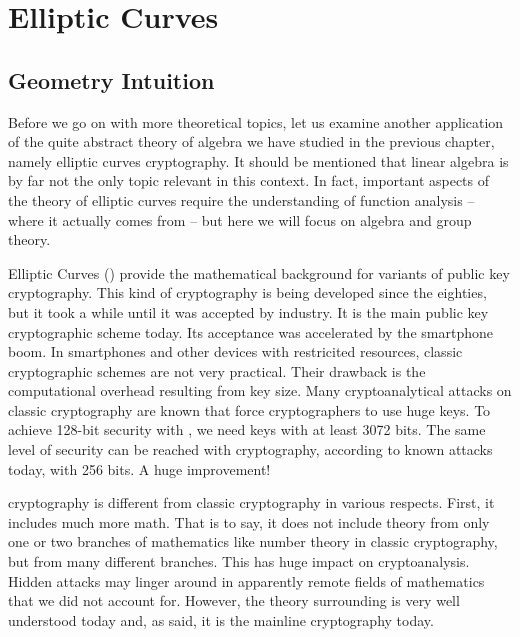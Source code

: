 \documentclass[tikz]{scrreprt}
\newcommand{\Conid}[1]{\mathit{#1}}
\def\resethooks{%
  \global\let\SaveRestoreHook\empty
  \global\let\ColumnHook\empty}
\let\hspre\empty
\let\hspost\empty
\begin{document}
\setlength{\parindent}{0pt}
\setlength{\parskip}{8pt}

\chapter{Elliptic Curves} %
\section{Geometry Intuition} 
\ignore{
\begingroup\par\noindent\advance\leftskip\mathindent\(
\begin{pboxed}\SaveRestoreHook
\column{B}{@{}>{\hspre}l<{\hspost}@{}}%
\column{E}{@{}>{\hspre}l<{\hspost}@{}}%
\>[B]{}\mathbf{module}\;\Conid{ECGeometry}{}\<[E]%
\\
\>[B]{}\mathbf{where}{}\<[E]%
\ColumnHook
\end{pboxed}
\)\par\noindent\endgroup\resethooks
}

Before we go on with more theoretical topics,
let us examine another application of the quite
abstract theory of algebra we have studied
in the previous chapter, namely 
elliptic curves cryptography. It should be
mentioned that linear algebra is by far 
not the only topic relevant in this context.
In fact, important aspects of the theory
of elliptic curves require the understanding
of function analysis -- where it actually
comes from -- but here we will focus on 
algebra and group theory.

Elliptic Curves () provide the mathematical
background for variants of public key cryptography.
This kind of cryptography is being developed
since the eighties, but it took a while until it
was accepted by industry. 
It is the main public key cryptographic scheme today.
Its acceptance was accelerated by the smartphone boom.
In smartphones and other devices with restricited
resources, classic cryptographic schemes are not
very practical. Their drawback is
the computational overhead resulting from key size.
Many cryptoanalytical attacks on classic
cryptography are known that force cryptographers
to use huge keys. To achieve 128-bit security 
with , we need keys with at least
\num{3072} bits. The same level of security
can be reached with  cryptography, 
according to known attacks today,
with 256 bits. A huge improvement!

 cryptography is different from
classic cryptography in various respects.
First, it includes much more math.
That is to say, it does not include 
theory from only one or two branches
of mathematics like number theory
in classic cryptography,
but from many different branches.
This has huge impact on cryptoanalysis.
Hidden attacks may linger around 
in apparently remote fields of mathematics
that we did not account for.
However, the theory surrounding 
is very well understood today and, as said,
it is the mainline cryptography today.
\end{document}
